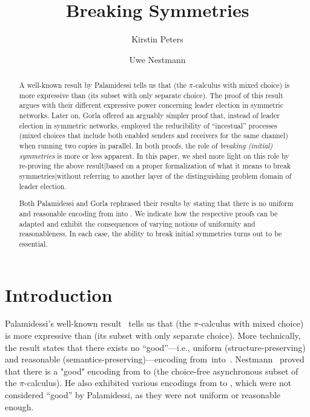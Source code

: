 \documentclass[11pt,techReport]{eptcs}
\title{Breaking Symmetries}
\author{Kirstin Peters
\institute{Technische Universit\"at Berlin, Germany}
\email{kirstin.peters@tu-berlin.de}
\and
Uwe Nestmann
\institute{Technische Universit\"at Berlin, Germany}
\email{uwe.nestmann@tu-berlin.de}
}
\begin{document}
\maketitle

\begin{abstract}
A well-known result by Palamidessi tells us that \pimix (the $\pi$-calculus with mixed choice) is more expressive than \pisep (its subset with only separate choice).  The proof of this result argues with their different expressive power concerning leader election in symmetric networks.  Later on, Gorla offered an arguably simpler proof that, instead of leader election in symmetric networks, employed the reducibility of ``incestual'' processes (mixed choices that include both enabled senders and receivers for the same channel) when running two copies in parallel.  In both proofs, the role of \emph{breaking (initial) symmetries} is more or less apparent.  In this paper, we shed more light on this role by re-proving the above result|based on a proper formalization of what it means to break symmetries|without referring to another layer of the distinguishing problem domain of leader election.

Both Palamidessi and Gorla rephrased their results by stating that there is no uniform and reasonable encoding from \pimix into \pisep.  We indicate how the respective proofs can be adapted and exhibit the consequences of varying notions of uniformity and reasonableness.  In each case, the ability to break initial symmetries turns out to be essential.
\end{abstract}

\section{Introduction}

Palamidessi's well-known result~\cite{palamidessi03} tells us that \pimix (the $\pi$-calculus with mixed choice) is more expressive than \pisep (its subset with only separate choice).
More technically, the result states that there exists no ``good''---i.e., uniform (structure-preserving) and reasonable (semantics-preserving)---encoding from~\pimix into~\pisep.  Nestmann~\cite{nestmann00} proved that there is a "good" encoding from \pisep to \piasyn (the choice-free asynchronous subset of the $\pi$-calculus).  He also exhibited various encodings from  \pimix to \pisep, which were not considered ``good'' by Palamidessi, as they were not uniform or reasonable enough.
\end{document}
